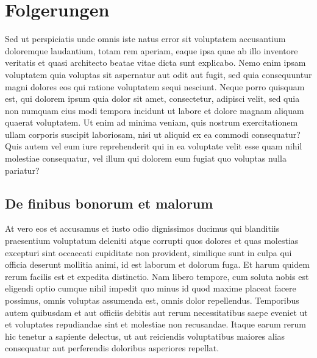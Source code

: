 %
%
%
\section{Folgerungen
\label{perturbation:section:folgerungen}}
Sed ut perspiciatis unde omnis iste natus error sit voluptatem
accusantium doloremque laudantium, totam rem aperiam, eaque ipsa
quae ab illo inventore veritatis et quasi architecto beatae vitae
dicta sunt explicabo. Nemo enim ipsam voluptatem quia voluptas sit
aspernatur aut odit aut fugit, sed quia consequuntur magni dolores
eos qui ratione voluptatem sequi nesciunt. Neque porro quisquam
est, qui dolorem ipsum quia dolor sit amet, consectetur, adipisci
velit, sed quia non numquam eius modi tempora incidunt ut labore
et dolore magnam aliquam quaerat voluptatem. Ut enim ad minima
veniam, quis nostrum exercitationem ullam corporis suscipit laboriosam,
nisi ut aliquid ex ea commodi consequatur? Quis autem vel eum iure
reprehenderit qui in ea voluptate velit esse quam nihil molestiae
consequatur, vel illum qui dolorem eum fugiat quo voluptas nulla
pariatur?

\subsection{De finibus bonorum et malorum
\label{perturbation:subsection:malorum}}
At vero eos et accusamus et iusto odio dignissimos ducimus qui
blanditiis praesentium voluptatum deleniti atque corrupti quos
dolores et quas molestias excepturi sint occaecati cupiditate non
provident, similique sunt in culpa qui officia deserunt mollitia
animi, id est laborum et dolorum fuga. Et harum quidem rerum facilis
est et expedita distinctio. Nam libero tempore, cum soluta nobis
est eligendi optio cumque nihil impedit quo minus id quod maxime
placeat facere possimus, omnis voluptas assumenda est, omnis dolor
repellendus. Temporibus autem quibusdam et aut officiis debitis aut
rerum necessitatibus saepe eveniet ut et voluptates repudiandae
sint et molestiae non recusandae. Itaque earum rerum hic tenetur a
sapiente delectus, ut aut reiciendis voluptatibus maiores alias
consequatur aut perferendis doloribus asperiores repellat.


